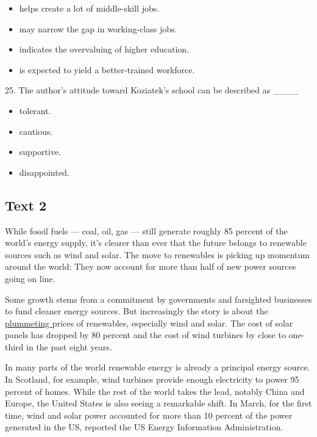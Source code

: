 \documentclass[UTF8,11pt]{ctexart}
\begin{document}
\begin{itemize}[leftmargin=2em,itemsep=.2em,topsep=.4em]\item[A.] helps create a lot of middle-skill jobs.
\item[B.] may narrow the gap in working-class jobs.
\item[C.] indicates the overvaluing of higher education.
\item[D.] is expected to yield a better-trained workforce.
\end{itemize}

25. The author’s attitude toward Koziatek’s school can be described as \_\_\_\_


\begin{itemize}[leftmargin=2em,itemsep=.2em,topsep=.4em]\item[A.] tolerant.
\item[B.] cautious.
\item[C.] supportive.
\item[D.] disappointed.
\end{itemize}

\subsection*{\textbf{Text 2}}


While fossil fuels — coal, oil, gas — still generate roughly 85 percent of the world’s energy supply, it’s clearer than ever that the future belongs to renewable sources such as wind and solar. The move to renewables is picking up momentum around the world: They now account for more than half of new power sources going on line.


Some growth stems from a commitment by governments and farsighted businesses to fund cleaner energy sources. But increasingly the story is about the \uline{plummeting }prices of renewables, especially wind and solar. The cost of solar panels has dropped by 80 percent and the cost of wind turbines by close to one-third in the past eight years.


In many parts of the world renewable energy is already a principal energy source. In Scotland, for example, wind turbines provide enough electricity to power 95 percent of homes. While the rest of the world takes the lead, notably China and Europe, the United States is also seeing a remarkable shift. In March, for the first time, wind and solar power accounted for more than 10 percent of the power generated in the US, reported the US Energy Information Administration.
\end{document}
